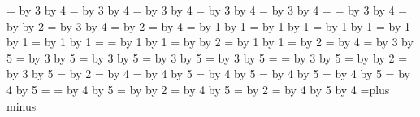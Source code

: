 \def\Tenpoint{\tenpoint\twelv@false\spaces@t}
\def\Twelvepoint{\twelvepoint\twelv@true\spaces@t}
%
\def\spaces@t{\rel@x
      \iftwelv@ \ifsingl@\subspaces@t3:4;\else\subspaces@t1:1;\fi
       \else \ifsingl@\subspaces@t3:5;\else\subspaces@t4:5;\fi \fi
      \ifdoubl@ \multiply\baselineskip by 5
	 \divide\baselineskip by 4 \fi }
%
\def\subspaces@t#1:#2;{
      \baselineskip = \normalbaselineskip
      \multiply\baselineskip by #1 \divide\baselineskip by #2
      \lineskip = \normallineskip
      \multiply\lineskip by #1 \divide\lineskip by #2
      \lineskiplimit = \normallineskiplimit
      \multiply\lineskiplimit by #1 \divide\lineskiplimit by #2
      \parskip = \normalparskip
      \multiply\parskip by #1 \divide\parskip by #2
      \abovedisplayskip = \normaldisplayskip
      \multiply\abovedisplayskip by #1 \divide\abovedisplayskip by #2
      \belowdisplayskip = \abovedisplayskip
      \abovedisplayshortskip = \normaldispshortskip
      \multiply\abovedisplayshortskip by #1
	\divide\abovedisplayshortskip by #2
      \belowdisplayshortskip = \abovedisplayshortskip
      \advance\belowdisplayshortskip by \belowdisplayskip
      \divide\belowdisplayshortskip by 2
      \smallskipamount = \skipregister
      \multiply\smallskipamount by #1 \divide\smallskipamount by #2
      \medskipamount = \smallskipamount \multiply\medskipamount by 2
      \bigskipamount = \smallskipamount \multiply\bigskipamount by 4 }
%
\def\normalbaselines{ \baselineskip=\normalbaselineskip
   \lineskip=\normallineskip \lineskiplimit=\normallineskip
   \iftwelv@\else \multiply\baselineskip by 4 \divide\baselineskip by 5
     \multiply\lineskiplimit by 4 \divide\lineskiplimit by 5
     \multiply\lineskip by 4 \divide\lineskip by 5 \fi }
%
\Twelvepoint  %
%
\hfuzz=1pt
\vfuzz=0.2pt
\newdimen\HOFFSET  \HOFFSET=0pt
\newdimen\VOFFSET  \VOFFSET=0pt
\newdimen\HSWING   \HSWING=0pt
\dimen\footins=8in
%
%
%
\newskip\pagebottomfiller
\pagebottomfiller=\z@ plus \z@ minus \z@
%
\def\pagecontents{
   \ifvoid\topins\else\unvbox\topins\vskip\skip\topins\fi
   \dimen@ = \dp255 \unvbox255
   \vskip\pagebottomfiller
   \ifvoid\footins\else\vskip\skip\footins\footrule\unvbox\footins\fi
   \ifr@ggedbottom \kern-\dimen@ \vfil \fi }
%
\def\makeheadline{\vbox to 0pt{ \skip@=\topskip
      \advance\skip@ by -12pt \advance\skip@ by -2\normalbaselineskip
      \vskip\skip@ \line{\vbox to 12pt{}\the\headline} \vss
      }\nointerlineskip}
